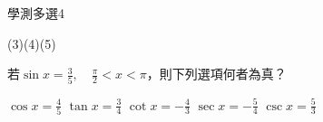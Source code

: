 \begin{QUESTIONS}
    \begin{QUESTION}
        \begin{ExamInfo}{90}{學測}{多選}{4}
        \end{ExamInfo}
        \begin{ExamAnsRateInfo}{}{}{}{}
            (3)(4)(5)
        \end{ExamAnsRateInfo}
        \begin{QBODY}
			若$\sin x=\frac{3}{5},\quad \frac{\pi }{2}<x<\pi $，則下列選項何者為真？
			\begin{QOPS}
				\QOP $\cos x=\frac{4}{5}$
				\QOP $\tan x=\frac{3}{4}$
				\QOP $\cot x=-\frac{4}{3}$
				\QOP $\sec x=-\frac{5}{4}$
				\QOP $\csc x=\frac{5}{3}$
			\end{QOPS}


\end{QBODY}
\end{QUESTION}
\end{QUESTIONS}
